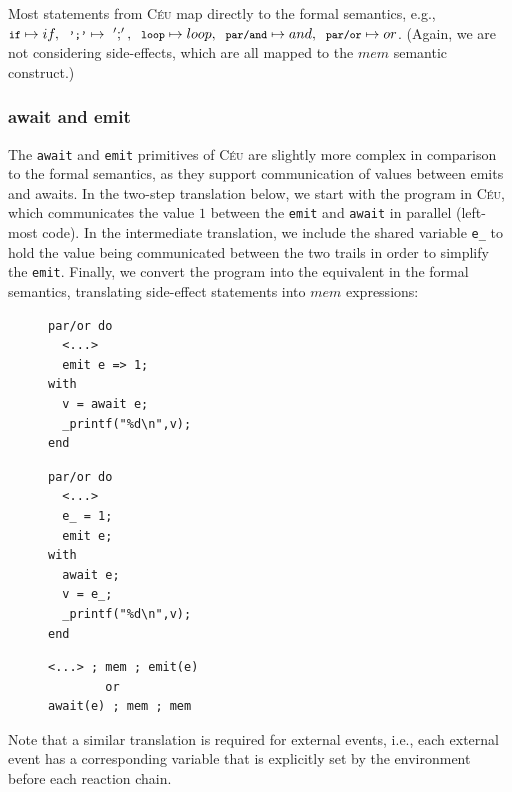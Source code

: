 \documentclass{sigplanconf}
\newcommand{\CEU}{\textsc{C\'{e}u}\xspace}
\newcommand{\code}[1] {{\small{\texttt{#1}}}}
\newcommand{\1}{\;}
\newcommand{\2}{\;\;}
\newcommand{\3}{\;\;\;}
\newcommand{\5}{\;\;\;\;\;}
\begin{document}
Most statements from \CEU map directly to the formal semantics, e.g.,
$
    \code{if}      \mapsto if   ,\2
    \code{';'}     \mapsto ~';' ,\2
    \code{loop}    \mapsto loop ,\2
    \code{par/and} \mapsto and  ,\2
    \code{par/or}  \mapsto or
$.
(Again, we are not considering side-effects, which are all mapped to the $mem$ 
semantic construct.)

\subsubsection{await and emit}

The \code{await} and \code{emit} primitives of \CEU are slightly more complex 
in comparison to the formal semantics, as they support communication of values 
between emits and awaits.
In the two-step translation below, we start with the program in \CEU, which 
communicates the value $1$ between the \code{emit} and \code{await} in parallel 
(left-most code).
In the intermediate translation, we include the shared variable \code{e\_} to 
hold the value being communicated between the two trails in order to simplify 
the \code{emit}.
Finally, we convert the program into the equivalent in the formal semantics, 
translating side-effect statements into $mem$ expressions:

\begin{figure}[h!]
\begin{minipage}[t]{0.32\linewidth}
\begin{lstlisting}
par/or do
  <...>
  emit e => 1;
with
  v = await e;
  _printf("%d\n",v);
end
\end{lstlisting}
\end{minipage}
%
\begin{minipage}[t]{0.32\linewidth}
\begin{lstlisting}
par/or do
  <...>
  e_ = 1;
  emit e;
with
  await e;
  v = e_;
  _printf("%d\n",v);
end
\end{lstlisting}
\end{minipage}
%
\begin{minipage}[t]{0.34\linewidth}
\begin{lstlisting}
<...> ; mem ; emit(e)
        or
await(e) ; mem ; mem
\end{lstlisting}
\end{minipage}
\end{figure}

Note that a similar translation is required for external events, i.e., each 
external event has a corresponding variable that is explicitly set by the 
environment before each reaction chain.
\end{document}
